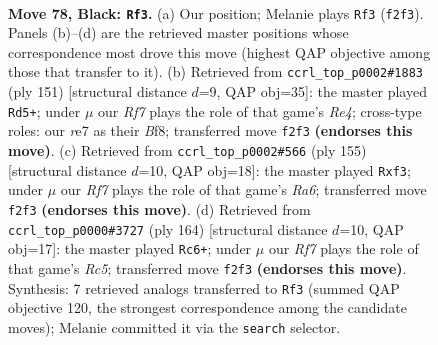\documentclass[11pt]{article}
\begin{document}
\clearpage

\begin{figure}[p]\centering
\begin{subfigure}{0.46\textwidth}\centering
\resizebox{\linewidth}{!}{%
\newchessgame
\chessboard[
  setfen={8/p3R3/P6k/5p2/b4P2/8/5r2/7K b - - 7 78},
  showmover=false,
  pgfstyle=straightmove, color=movearrow, markmove={f2-f3}
]}
\caption{}
\end{subfigure}\hfill
\begin{subfigure}{0.46\textwidth}\centering
\resizebox{\linewidth}{!}{%
\newchessgame
\chessboard[
  setfen={5b2/7k/R7/4r3/p6B/P2KP3/8/8 b - - 6 76},
  showmover=false,
  pgfstyle=straightmove, color=movearrow, markmove={e5-d5}
]}
\caption{}
\end{subfigure}
\\[4pt]
\begin{subfigure}{0.46\textwidth}\centering
\resizebox{\linewidth}{!}{%
\newchessgame
\chessboard[
  setfen={8/7k/8/2R3p1/6P1/r4P2/3K4/8 b - - 48 78},
  showmover=false,
  pgfstyle=straightmove, color=movearrow, markmove={a3-f3}
]}
\caption{}
\end{subfigure}\hfill
\begin{subfigure}{0.46\textwidth}\centering
\resizebox{\linewidth}{!}{%
\newchessgame
\chessboard[
  setfen={8/8/5k2/2R2p2/2p5/2P3K1/3Pr3/8 w - - 8 83},
  showmover=false,
  pgfstyle=straightmove, color=movearrow, markmove={c5-c6}
]}
\caption{}
\end{subfigure}
\caption{\textbf{Move 78, Black: \texttt{Rf3}.} (a) Our position; Melanie plays \texttt{Rf3} (\texttt{f2f3}). Panels (b)--(d) are the retrieved master positions whose correspondence most drove this move (highest QAP objective among those that transfer to it). (b) Retrieved from \texttt{ccrl\_top\_p0002\#1883} (ply 151) [structural distance $d$=9, QAP obj=35]: the master played \texttt{Rd5+}; under $\mu$ our \emph{Rf7} plays the role of that game's \emph{Re4}; cross-type roles: our \emph{r}e7 as their \emph{B}f8; transferred move \texttt{f2f3} \textbf{(endorses this move)}. (c) Retrieved from \texttt{ccrl\_top\_p0002\#566} (ply 155) [structural distance $d$=10, QAP obj=18]: the master played \texttt{Rxf3}; under $\mu$ our \emph{Rf7} plays the role of that game's \emph{Ra6}; transferred move \texttt{f2f3} \textbf{(endorses this move)}. (d) Retrieved from \texttt{ccrl\_top\_p0000\#3727} (ply 164) [structural distance $d$=10, QAP obj=17]: the master played \texttt{Rc6+}; under $\mu$ our \emph{Rf7} plays the role of that game's \emph{Rc5}; transferred move \texttt{f2f3} \textbf{(endorses this move)}. Synthesis: 7 retrieved analogs transferred to \texttt{Rf3} (summed QAP objective 120, the strongest correspondence among the candidate moves); Melanie committed it via the \texttt{search} selector.}
\label{fig:thought-m155}
\end{figure}
\end{document}
